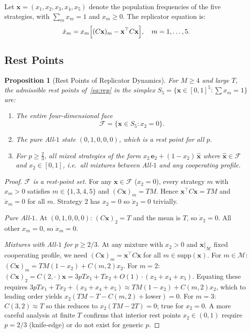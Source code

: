 \documentclass[12pt,a4paper]{article}
\newtheorem{proposition}{Proposition}[section]
\begin{document}
Let $\mathbf{x}=(x_1,x_2,x_3,x_4,x_5)$ denote the population frequencies of
the five strategies, with $\sum_m x_m=1$ and $x_m\geq 0$.  The replicator
equation is:
\begin{equation}\label{eq:rep}
  \dot{x}_m = x_m\Bigl[(C\mathbf{x})_m - \mathbf{x}^\top C\mathbf{x}\Bigr],
  \quad m=1,\ldots,5.
\end{equation}

\subsection{Rest Points}

\begin{proposition}[Rest Points of Replicator Dynamics]\label{prop:rest}
For $M\geq 4$ and large $T$, the admissible rest points of~\eqref{eq:rep}
in the simplex $S_5=\{\mathbf{x}\in[0,1]^5:\sum x_m=1\}$ are:
\begin{enumerate}
  \item The entire four-dimensional face
        \begin{equation}\label{eq:coopface}
          \mathcal{F} = \{\mathbf{x}\in S_5 : x_2=0\}.
        \end{equation}
  \item The pure All-$1$ state $(0,1,0,0,0)$, which is a rest point for all $p$.
  \item For $p\geq\tfrac{2}{3}$, all mixed strategies of the form
        $x_2\,\mathbf{e}_2 + (1-x_2)\,\hat{\mathbf{x}}$ where
        $\hat{\mathbf{x}}\in\mathcal{F}$ and $x_2\in[0,1]$, i.e.\ all
        mixtures between All-$1$ and any cooperating profile.
\end{enumerate}
\end{proposition}

\begin{proof}
\textit{$\mathcal{F}$ is a rest-point set.}  For any $\mathbf{x}\in\mathcal{F}$
($x_2=0$), every strategy $m$ with $x_m>0$ satisfies $m\in\{1,3,4,5\}$ and
$(C\mathbf{x})_m = TM$.  Hence $\mathbf{x}^\top C\mathbf{x}=TM$ and
$\dot{x}_m=0$ for all $m$.  Strategy 2 has $x_2=0$ so $\dot{x}_2=0$ trivially.

\textit{Pure All-$1$.}  At $(0,1,0,0,0)$: $(C\mathbf{x})_2=T$ and the mean is
$T$, so $\dot{x}_2=0$.  All other $x_m=0$, so $\dot{x}_m=0$.

\textit{Mixtures with All-$1$ for $p\geq 2/3$.}  At any mixture with $x_2>0$
and $\mathbf{x}|_{\mathcal{M}}$ fixed cooperating profile, we need
$(C\mathbf{x})_m = \mathbf{x}^\top C\mathbf{x}$ for all $m\in\text{supp}(\mathbf{x})$.
For $m\in\mathcal{M}$: $(C\mathbf{x})_m=TM(1-x_2)+C(m,2)x_2$.
For $m=2$: $(C\mathbf{x})_2=C(2,\cdot)\mathbf{x}=3pT x_1 + Tx_2 + O(1)\cdot(x_3+x_4+x_5)$.
Equating these requires $3pTx_1+Tx_2+(x_3+x_4+x_5)\approx TM(1-x_2)+C(m,2)x_2$,
which to leading order yields $x_2(TM-T-C(m,2)+\text{lower})=0$.
For $m=3$: $C(3,2)\approx T$ so this reduces to $x_2(TM-2T)=0$; true for $x_2=0$.
A more careful analysis at finite $T$ confirms that interior rest points
$x_2\in(0,1)$ require $p=2/3$ (knife-edge) or do not exist for generic $p$.
\end{proof}
\end{document}

